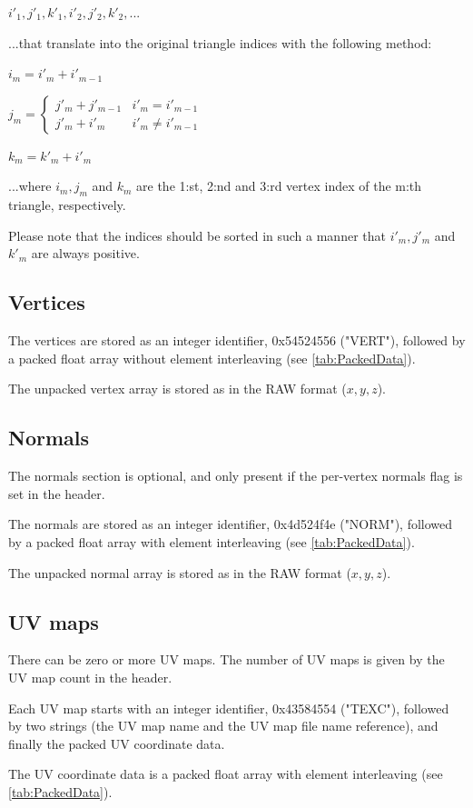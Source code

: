 $i'_1, j'_1, k'_1, i'_2, j'_2, k'_2, ...$

...that translate into the original triangle indices with the following method:

$i_m = i'_m + i'_{m-1}$

$j_m = \left\{\begin{array}{ll}
j'_m + j'_{m-1}  & i'_m = i'_{m-1} \\
j'_m + i'_m & i'_m \neq i'_{m-1}
\end{array} \right.$

$k_m = k'_m + i'_m$

...where $i_m, j_m$ and $k_m$ are the 1:st, 2:nd and 3:rd vertex index of the
m:th triangle, respectively.

Please note that the indices should be sorted in such a manner that $i'_m, j'_m$
and $k'_m$ are always positive.

\subsection{Vertices}
The vertices are stored as an integer identifier, 0x54524556 ("VERT"), followed
by a packed float array without element interleaving (see \ref{tab:PackedData}).

The unpacked vertex array is stored as in the RAW format ($x, y, z$).

\subsection{Normals}
The normals section is optional, and only present if the per-vertex normals
flag is set in the header.

The normals are stored as an integer identifier, 0x4d524f4e ("NORM"), followed
by a packed float array with element interleaving (see \ref{tab:PackedData}).

The unpacked normal array is stored as in the RAW format ($x, y, z$).

\subsection{UV maps}
There can be zero or more UV maps. The number of UV maps is given by the
UV map count in the header.

Each UV map starts with an integer identifier, 0x43584554 ("TEXC"), followed
by two strings (the UV map name and the UV map file name reference), and
finally the packed UV coordinate data.

The UV coordinate data is a packed float array with element interleaving
(see \ref{tab:PackedData}).

